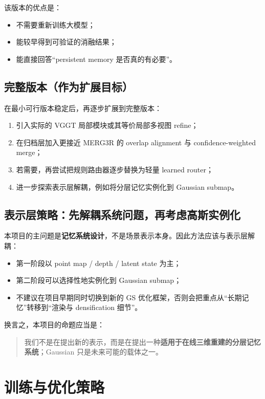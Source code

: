 \documentclass[12pt]{article}
\begin{document}
该版本的优点是：
\begin{itemize}
  \item 不需要重新训练大模型；
  \item 能较早得到可验证的消融结果；
  \item 能直接回答“persistent memory 是否真的有必要”。
\end{itemize}

\subsection{完整版本（作为扩展目标）}

在最小可行版本稳定后，再逐步扩展到完整版本：
\begin{enumerate}
  \item 引入实际的 VGGT 局部模块或其等价局部多视图 refine；
  \item 在归档层加入更接近 MERG3R 的 overlap alignment 与 confidence-weighted merge；
  \item 若需要，再尝试把规则路由器逐步替换为轻量 learned router；
  \item 进一步探索表示层解耦，例如将分层记忆实例化到 Gaussian submap。
\end{enumerate}

\subsection{表示层策略：先解耦系统问题，再考虑高斯实例化}

本项目的主问题是\textbf{记忆系统设计}，不是场景表示本身。因此方法应该与表示层解耦：
\begin{itemize}
  \item 第一阶段以 point map / depth / latent state 为主；
  \item 第二阶段可以选择性地实例化到 Gaussian submap；
  \item 不建议在项目早期同时切换到新的 GS 优化框架，否则会把重点从“长期记忆”转移到“渲染与 densification 细节”。
\end{itemize}

换言之，本项目的命题应当是：
\begin{quote}
我们不是在提出新的表示，而是在提出一种\textbf{适用于在线三维重建的分层记忆系统}；Gaussian 只是未来可能的载体之一。
\end{quote}

\section{训练与优化策略}
\end{document}
